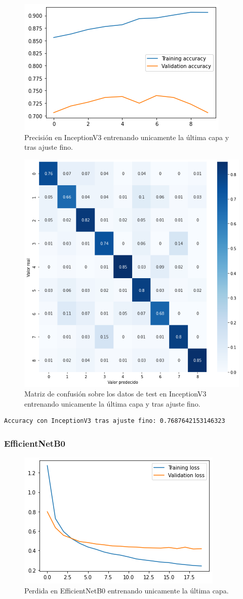 \begin{figure}[H]
  \centering
  \includegraphics[width=0.5\linewidth]{Imagenes/entrenamiento_redes/ult/inception_fine_acc.png}
  \caption{Precisión en InceptionV3 entrenando unicamente la última capa y tras ajuste fino.}
\end{figure}

\begin{figure}[H]
  \centering
  \includegraphics[width=0.5\linewidth]{Imagenes/entrenamiento_redes/ult/inception_fine_matriz.png}
  \caption{Matriz de confusión sobre los datos de test en InceptionV3 entrenando unicamente la última capa y tras ajuste fino.}
\end{figure}


\begin{lstlisting}
Accuracy con InceptionV3 tras ajuste fino: 0.7687642153146323
\end{lstlisting}


\subsubsection{EfficientNetB0}

\begin{figure}[H]
  \centering
  \includegraphics[width=0.5\linewidth]{Imagenes/entrenamiento_redes/ult/efficientnet_ult_loss.png}
  \caption{Perdida en EfficientNetB0 entrenando unicamente la última capa.}
\end{figure}

